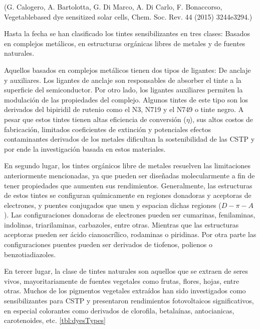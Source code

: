 (G. Calogero, A. Bartolotta, G. Di Marco, A. Di Carlo, F. Bonaccorso, Vegetablebased
dye sensitized solar cells, Chem. Soc. Rev. 44 (2015) 3244e3294.)

Hasta la fecha se han clasificado los tintes sensibilizantes en tres clases: Basados en complejos metálicos, en estructuras orgánicas libres de metales y de fuentes naturales.

Aquellos basados en complejos metálicos tienen dos tipos de ligantes: De anclaje y auxiliares. Los ligantes de anclaje son responsables de absorber el tinte a la superficie del semiconductor. Por otro lado, los ligantes auxiliares permiten la modulación de las propiedades del complejo. Algunos tintes de este tipo son los derivados del bipiridil de rutenio como el N3, N719 y el N749 o tinte negro. A pesar que estos tintes tienen altas eficiencia de conversión ($\eta$), sus altos costos de fabricación, limitados coeficientes de extinción y potenciales efectos contaminantes derivados de los metales dificultan la sostenibilidad de las CSTP y por ende la investigación basada en estos materiales. 

En segundo lugar, los tintes orgánicos libre de metales resuelven las limitaciones anteriormente mencionadas, ya que pueden ser diseñadas molecularmente a fin de tener propiedades que aumenten sus rendimientos. Generalmente, las estructuras de estos tintes se configuran químicamente en regiones donadoras y aceptoras de electrones, y puentes conjugados que unen y espacian dichas regiones ($D-\pi-A$). Las configuraciones donadoras de electrones pueden ser cumarinas, fenilaminas, indolinas, triarilaminas, carbazoles, entre otras. Mientras que las estructuras aceptoras pueden ser ácido cianoacrílico, rodaminas o piridinas. Por otra parte las configuraciones puentes pueden ser derivados de tiofenos, polienos o benzotiadiazoles. 

En tercer lugar, la clase de tintes naturales son aquellos que se extraen de seres vivos, mayoritariamente de fuentes vegetales como frutas, flores, hojas, entre otras. Muchos de los pigmentos vegetales extraídos han sido investigados como sensibilizantes para CSTP y presentaron rendimientos fotovoltaicos significativos, en especial colorantes como derivados de clorofila, betalaínas, antocianicas, carotenoides, etc. \ref{tbl:dyesTypes}



